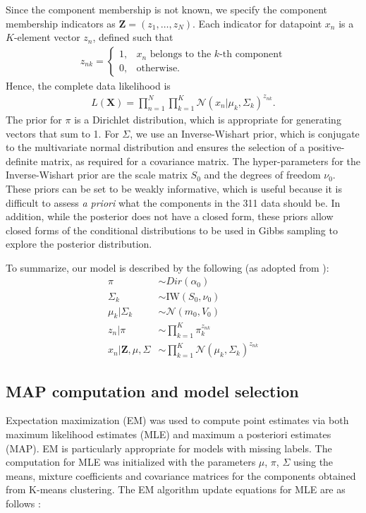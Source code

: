 \documentclass[twoside]{article}
\newcommand{\N}{\mathcal{N}}
\theoremstyle{theorem}
\theoremstyle{theorem}
\theoremstyle{theorem}
\theoremstyle{lemma}
\theoremstyle{definition}
\theoremstyle{example}
\begin{document}
Since the component membership is not known, we specify the component membership indicators as $\mathbf{Z} = (z_1, \ldots, z_N)$. Each indicator for datapoint $x_n$ is a $K$-element vector $z_n$, defined such that \begin{align}
z_{nk} = \begin{cases}
1, & x_n\text{ belongs to the $k$-th component}\\
0, & \text{otherwise}. 
\end{cases}
\end{align}
Hence, the complete data likelihood is 
\begin{align}
L(\mathbf{X}) = \prod_{n=1}^N\prod_{k=1}^K \N(x_n| \mu_k, \Sigma_k)^{z_{nk}}.
\end{align}
The prior for $\pi$ is a Dirichlet distribution, which is appropriate for generating vectors that sum to 1. For $\Sigma$, we use an Inverse-Wishart prior, which is conjugate to the multivariate normal distribution and ensures the selection of a positive-definite matrix, as required for a covariance matrix. The hyper-parameters for the Inverse-Wishart prior are the scale matrix $S_0$ and the degrees of freedom $\nu_0$.  These priors can be set to be weakly informative, which is useful because it is difficult to assess \textit{a priori} what the components in the 311 data should be. In addition, while the posterior does not have a closed form, these priors allow closed forms of the conditional distributions to be used in Gibbs sampling to explore the posterior distribution. 

To summarize, our model is described by the following (as adopted from \cite{Gelman, Jones}): 
\begin{align}
\pi &\sim Dir(\alpha_0)\\
\Sigma_k &\sim \mathrm{IW}(S_0, \nu_0)\\
\mu_k | \Sigma_k &\sim \N(m_0, V_0)\\
z_n | \pi &\sim \prod_{k=1}^K \pi_k^{z_{nk}}\\
x_n | \mathbf{Z}, \mu, \Sigma &\sim \prod_{k=1}^K \N(\mu_k, \Sigma_k)^{z_{nk}}
\end{align}

\subsection{MAP computation and model selection}
Expectation maximization (EM) was used to compute point estimates via both maximum likelihood estimates (MLE) and maximum a posteriori estimates (MAP). EM is particularly appropriate for models with missing labels. The computation for MLE was initialized with the parameters $\mu$, $\pi$, $\Sigma$ using the means, mixture coefficients and covariance matrices for the components obtained from K-means clustering. The EM algorithm update equations for MLE are as follows \cite{Bishop}: 
\end{document}
